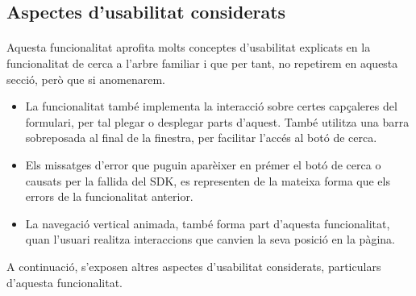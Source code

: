 \subsection{Aspectes d'usabilitat considerats}

    \paragraph{}
    Aquesta funcionalitat aprofita molts conceptes d'usabilitat explicats en la funcionalitat de cerca a l’arbre familiar i que per tant, no repetirem en aquesta secció, però que si anomenarem.

    \begin{itemize}
        \item La funcionalitat també implementa la interacció sobre certes capçaleres del formulari, per tal plegar o desplegar parts d'aquest. També utilitza una barra sobreposada al final de la finestra, per facilitar l'accés al botó de cerca.
        \item Els missatges d'error que puguin aparèixer en prémer el botó de cerca o causats per la fallida del SDK, es representen de la mateixa forma que els errors de la funcionalitat anterior.
        \item La navegació vertical animada, també forma part d'aquesta funcionalitat, quan l'usuari realitza interaccions que canvien la seva posició en la pàgina.
    \end{itemize}

    A continuació, s'exposen altres aspectes d'usabilitat considerats, particulars d'a\-ques\-ta funcionalitat.

    
    
    
